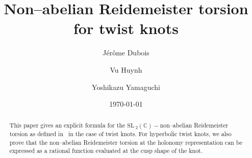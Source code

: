 \documentclass[a4paper]{amsart}
\theoremstyle{plain}
\theoremstyle{definition}
\theoremstyle{remark}
\begin{document}
%
%


\title{Non--abelian Reidemeister torsion for twist knots}


\author{J\'er\^ome Dubois \and Vu Huynh \and Yoshikazu Yamaguchi}

\address{Centre de Recerca Matematica, Apartat 50, E-08193 Bellaterra, Spain \\ \& Institut de Math\'ematiques de Jussieu, 
Universit\'e Paris 7 (Denis Diderot), 
Case 7012, 
2, place Jussieu, 
75251 Paris Cedex 05
France, dubois@math.jussieu.fr}

\address{Faculty of Mathematics and Informatics, University of Natural Sciences, Vietnam National University, 227 Nguyen Van Cu, District 5, Ho Chi Minh City, Vietnam}

\address{Graduate School of Mathematical Sciences, 
University of Tokyo, 3-8-1 Komaba Meguro, 
Tokyo 153-8914, Japan}

\date{\today}

\begin{abstract}
    This paper gives an explicit formula for the $\mathrm{SL}_{\;2}(\mathbb{C})-$non--abelian Reidemeister torsion as defined in~\cite{JDFibre} in the case of twist knots. For hyperbolic twist knots, we also prove that the non--abelian Reidemeister torsion at the holonomy representation can be expressed as a rational function evaluated at the cusp shape of the knot. 
\end{abstract}

\maketitle





\end{document}

